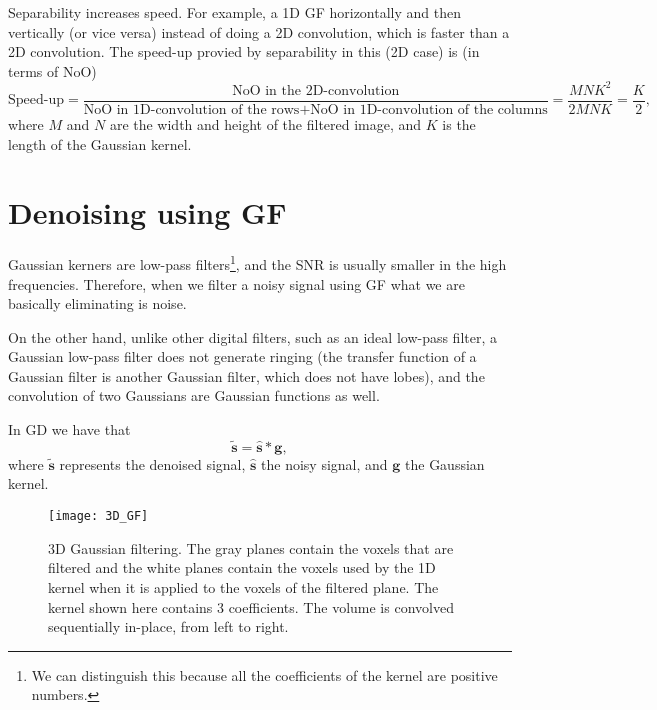 Separability increases speed. For example, a 1D \gls{GF} horizontally
and then vertically (or vice versa) instead of doing a 2D convolution,
which is faster than a 2D convolution. The speed-up provied by
separability in this (2D case) is (in terms of \gls{NoO})
\begin{equation}
  \text{Speed-up} = \frac{\text{NoO~in~the~2D-convolution}}{\text{NoO~in~1D-convolution~of~the~rows}+\text{NoO~in~1D-convolution~of~the~columns}} = \frac{MNK^2}{2MNK} = \frac{K}{2},
\end{equation}
where $M$ and $N$ are the width and height of the filtered image, and
$K$ is the length of the Gaussian kernel.

\section{Denoising using \acrshort{GF}}

Gaussian kerners are low-pass filters\footnote{We can distinguish this
  because all the coefficients of the kernel are positive numbers.},
and the \gls{SNR} is usually smaller in the high
frequencies. Therefore, when we filter a noisy signal using \gls{GF}
what we are basically eliminating is noise.

On the other hand, unlike other digital filters, such as an ideal low-pass
filter, a Gaussian low-pass filter does not generate ringing (the
transfer function of a Gaussian filter is another Gaussian filter,
which does not have lobes), and the convolution of two Gaussians are Gaussian
functions as well. 

In \gls{GD} we have that
\begin{equation}
  \tilde{\mathbf{s}} = \hat{\mathbf{s}}\ast\mathbf{g},
  \label{eq:GF}
\end{equation}
where $\tilde{\mathbf{s}}$ represents the denoised signal, $\hat{\mathbf{s}}$ the noisy signal, and $\mathbf{g}$ the Gaussian kernel.

\begin{figure}
  \centering
  \texttt{[image: 3D\_GF]}
  \caption{3D Gaussian filtering. The gray planes contain the voxels
    that are filtered and the white planes contain the voxels used by
    the 1D kernel when it is applied to the voxels of the filtered
    plane. The kernel shown here contains 3 coefficients. The volume
    is convolved sequentially in-place, from left to
    right.\label{fig:3D_GF}}
\end{figure}


